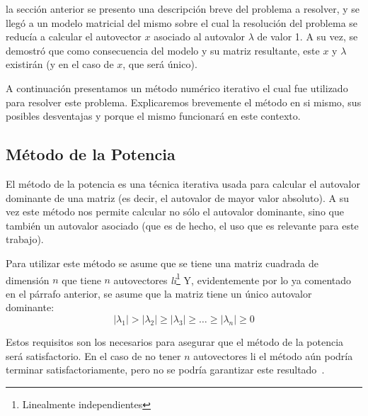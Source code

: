 \par {} la secci\'on anterior se presento una descripci\'on
breve del problema a resolver, y se lleg\'o a un modelo matricial del mismo
sobre el cual la resoluci\'on del problema se reduc\'ia a calcular el autovector
$x$ asociado al autovalor $\lambda$ de valor 1. A su vez, se demostr\'o que como
consecuencia del modelo y su matriz resultante, este $x$ y $\lambda$ existir\'an
(y en el caso de $x$, que ser\'a \'unico).

\par A continuaci\'on presentamos un m\'etodo num\'erico iterativo el cual fue
utilizado para resolver este problema. Explicaremos brevemente el m\'etodo en si
mismo, sus posibles desventajas y porque el mismo funcionar\'a en este contexto.

\subsection{M\'etodo de la Potencia}
\par El m\'etodo de la potencia es una t\'ecnica iterativa usada para calcular
el autovalor dominante de una matriz (es decir, el autovalor de mayor valor
absoluto). A su vez este m\'etodo nos permite calcular no s\'olo el autovalor
dominante, sino que tambi\'en un autovalor asociado (que es de hecho, el uso que
es relevante para este trabajo).

\par Para utilizar este m\'etodo se asume que se tiene una matriz cuadrada de
dimensi\'on $n$ que tiene $n$ autovectores \emph{li}\footnote{Linealmente
independientes} Y, evidentemente por lo ya comentado en el p\'arrafo anterior,
se asume que la matriz tiene un \'unico autovalor dominante:
\begin{equation*}
    |\lambda_1|>|\lambda_2|\geq|\lambda_3|\geq\dots\geq|\lambda_n|\geq 0
\end{equation*}

\par Estos requisitos son los necesarios para asegurar que el m\'etodo de la
potencia ser\'a satisfactorio. En el caso de no tener $n$ autovectores li el
m\'etodo a\'un podr\'ia terminar satisfactoriamente, pero no se podr\'ia
garantizar este resultado~\cite[p.576]{Burden2010}.

